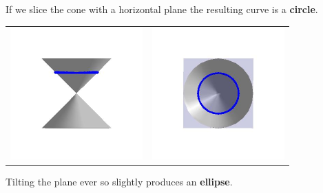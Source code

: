 \documentclass[nooutcomes]{ximera}
\begin{document}
If we slice the cone with a horizontal plane the resulting curve is a  \textbf{circle}.

\begin{center}

\begin{tabular}{cc}

\includegraphics[width=2in]{./ConicsGraphics/Circle01.jpg} & \includegraphics[width=2in]{./ConicsGraphics/Circle02.jpg} \\

\end{tabular}

\end{center}

Tilting the plane ever so slightly produces an  \textbf{ellipse}.
\end{document}

